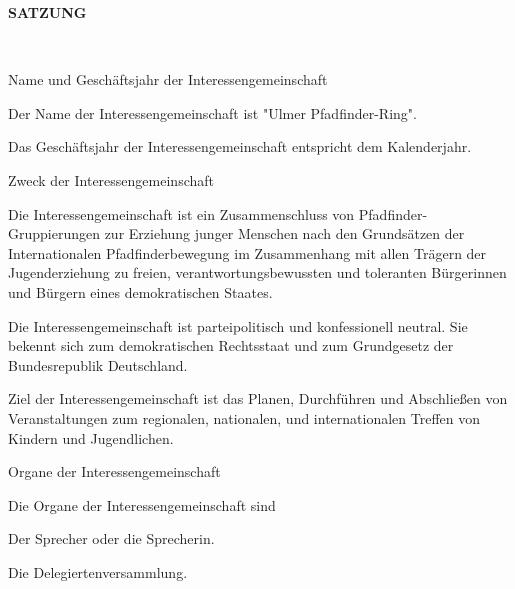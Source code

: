 \begin{Large}
    \textbf{SATZUNG}
\end{Large}
\\

\begin{legal}
    \item Name und Geschäftsjahr der Interessengemeinschaft
        \begin{legal}
            \item Der Name der Interessengemeinschaft ist "Ulmer Pfadfinder-Ring".
            \item Das Geschäftsjahr der Interessengemeinschaft entspricht dem Kalenderjahr.
        \end{legal}
    \item Zweck der Interessengemeinschaft
        \begin{legal}
            \item Die Interessengemeinschaft ist ein Zusammenschluss von Pfadfinder-Gruppierungen 
                  zur Erziehung junger Menschen nach den Grundsätzen der Internationalen 
                  Pfadfinderbewegung im Zusammenhang mit allen Trägern der Jugenderziehung zu 
                  freien, verantwortungsbewussten und toleranten Bürgerinnen und Bürgern eines 
                  demokratischen Staates.
            \item Die Interessengemeinschaft ist parteipolitisch und konfessionell neutral. 
                  Sie bekennt sich zum demokratischen Rechtsstaat und zum Grundgesetz der 
                  Bundesrepublik Deutschland.
            \item Ziel der Interessengemeinschaft ist das Planen, Durchführen und Abschließen von 
                  Veranstaltungen zum regionalen, nationalen, und internationalen Treffen von 
                  Kindern und Jugendlichen.
        \end{legal}
    \item Organe der Interessengemeinschaft
        \begin{legal}
            \item Die Organe der Interessengemeinschaft sind
                \begin{legal}
                    \item Der Sprecher oder die Sprecherin.
                    \item Die Delegiertenversammlung.

\end{legal}
\end{legal}
\end{legal}
